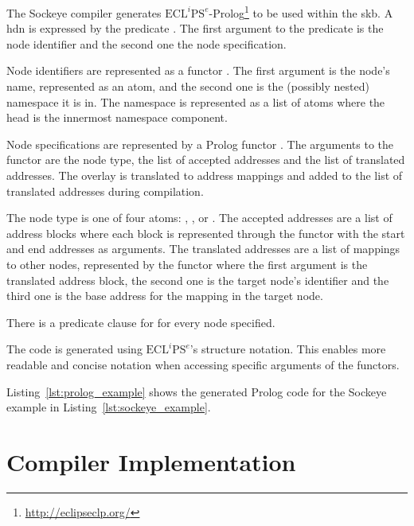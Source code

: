\documentclass[a4paper,11pt,twoside]{report}
\begin{document}
{{{The Sockeye compiler generates \(\text{ECL}^i\text{PS}^e\)-Prolog\footnote{\href{http://eclipseclp.org/}{http://eclipseclp.org/}} to be used within the \gls{skb}.
A \gls{hdn} is expressed by the predicate .
The first argument to the predicate is the node identifier and the second one the node specification.

Node identifiers are represented as a functor .
The first argument is the node's name, represented as an atom, and the second one is the (possibly nested) namespace it is in.
The namespace is represented as a list of atoms where the head is the innermost namespace component.

Node specifications are represented by a Prolog functor .
The arguments to the functor are the node type, the list of accepted addresses and the list of translated addresses.
The overlay is translated to address mappings and added to the list of translated addresses during compilation.

The node type is one of four atoms: , ,  or .
The accepted addresses are a list of address blocks where each block is represented through the functor  with the start and end addresses as arguments.
The translated addresses are a list of mappings to other nodes, represented by the functor  where the first argument is the translated address block, the second one is the target node's identifier and the third one is the base address for the mapping in the target node.

There is a predicate clause for  for every node specified.

The code is generated using \(\text{ECL}^i\text{PS}^e\)'s structure notation.
This enables more readable and concise notation when accessing specific arguments of the functors.

Listing~\ref{lst:prolog_example} shows the generated Prolog code for the Sockeye example in Listing~\ref{lst:sockeye_example}.

\clearpage



\chapter{Compiler Implementation}
\label{chap:compiler}

}}}
\end{document}
